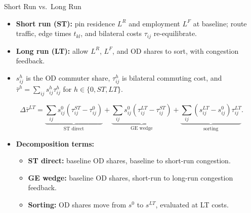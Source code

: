 \documentclass[11pt,aspectratio=169]{beamer}
\begin{document}
\begin{frame}{Short Run vs.\ Long Run}
\begin{itemize}\small\setlength\itemsep{0.48em}
  \item \textbf{Short run (ST):} pin residence $L^R$ and employment $L^F$ at baseline; route traffic, edge times $t_{kl}$, and bilateral costs $\tau_{ij}$ re-equilibrate.
  \item \textbf{Long run (LT):} allow $L^R$, $L^F$, and OD shares to sort, with congestion feedback.
  \item $s_{ij}^{h}$ is the OD commuter share, $\tau_{ij}^{h}$ is bilateral commuting cost, and $\bar\tau^{h}=\sum_{ij}s_{ij}^{h}\tau_{ij}^{h}$ for $h\in\{0,ST,LT\}$.
\end{itemize}
\vspace{0.10em}
{\footnotesize
\begin{equation*}
\Delta\bar\tau^{LT}=
\underbrace{\textstyle\sum_{ij}s_{ij}^0\left(\tau_{ij}^{ST}-\tau_{ij}^0\right)}_{\text{ST direct}}
+\underbrace{\textstyle\sum_{ij}s_{ij}^0\left(\tau_{ij}^{LT}-\tau_{ij}^{ST}\right)}_{\text{GE wedge}}
+\underbrace{\textstyle\sum_{ij}\left(s_{ij}^{LT}-s_{ij}^0\right)\tau_{ij}^{LT}}_{\text{sorting}}.
\end{equation*}
}
\vspace{-0.55em}
\begin{itemize}\small
  \item \textbf{Decomposition terms:}
  \begin{itemize}\footnotesize\setlength\itemsep{0.18em}
    \item \textbf{ST direct:} baseline OD shares, baseline to short-run congestion.
    \item \textbf{GE wedge:} baseline OD shares, short-run to long-run congestion feedback.
    \item \textbf{Sorting:} OD shares move from $s^0$ to $s^{LT}$, evaluated at LT costs.
  \end{itemize}
\end{itemize}
\end{frame}
\end{document}
